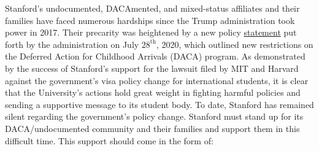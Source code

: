 \documentclass[12pt, titlepage, letterpaper]{article}
\begin{document}
Stanford's undocumented, DACAmented, and mixed-status affiliates and their families have faced numerous hardships since the Trump administration took power in 2017. Their precarity was heightened by a new policy \href{https://www.dhs.gov/news/2020/07/28/department-homeland-security-will-reject-initial-requests-daca-it-weighs-future}{statement} put forth by the administration on July $28^{\mathrm{th}}$, 2020, which outlined new restrictions on the Deferred Action for Childhood Arrivals (DACA) program. As demonstrated by the success of Stanford’s support for the lawsuit filed by MIT and Harvard against the government’s visa policy change for international students, it is clear that the University’s actions hold great weight in fighting harmful policies and sending a supportive message to its student body. To date, Stanford has remained silent regarding the government’s policy change. Stanford must stand up for its DACA/undocumented community and their families and support them in this difficult time. This support should come in the form of:
\end{document}
